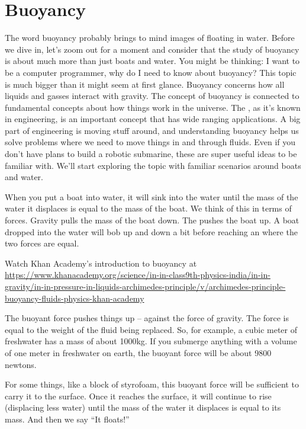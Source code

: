 \chapter{Buoyancy}

The word buoyancy probably brings to mind images of floating in water. Before we dive in, let's zoom out for a moment and consider that the study of buoyancy is about much more than just boats and water. You might be thinking: I want to be a computer programmer, why do I need to know about buoyancy? This topic is much bigger than it might seem at first glance. Buoyancy concerns how all liquids and gasses interact with gravity. The concept of buoyancy is connected to fundamental concepts about how things work in the universe. The , as it’s known in engineering, is an important concept that has wide ranging applications. A big part of engineering is moving stuff around, and understanding buoyancy helps us solve problems where we need to move things in and through fluids. Even if you don't have plans to build a robotic submarine, these are super useful ideas to be familiar with. We’ll start exploring the topic with familiar scenarios around boats and water. 

When you put a boat into water, it will sink into the water until
the mass of the water it displaces is equal to the mass of the
boat. We think of this in terms of forces. Gravity pulls the mass of
the boat down. The  pushes the boat up. A boat
dropped into the water will bob up and down a bit before reaching an
 where the two forces are equal.

Watch Khan Academy's introduction to buoyancy at \url{https://www.khanacademy.org/science/in-in-class9th-physics-india/in-in-gravity/in-in-pressure-in-liquids-archimedes-principle/v/archimedes-principle-buoyancy-fluids-physics-khan-academy}

The buoyant force pushes things up -- against the force of
gravity. The force is equal to the weight of the fluid being
replaced. So, for example, a cubic meter of freshwater has a mass of
about 1000kg.  If you submerge anything with a volume of one meter in
freshwater on earth, the buoyant force will be about 9800 newtons.

For some things, like a block of styrofoam, this buoyant force will be
sufficient to carry it to the surface. Once it reaches the surface, it
will continue to rise (displacing less water) until the mass of the
water it displaces is equal to its mass. And then we say ``It floats!''

